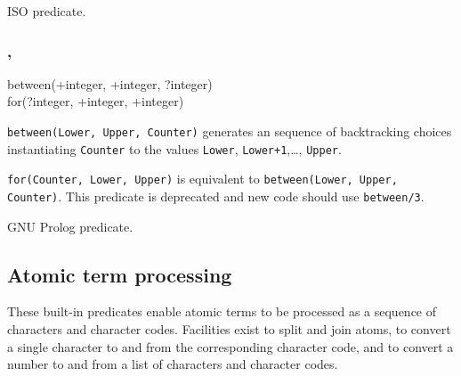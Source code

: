\PlErrorsNone

\Portability

ISO predicate.

\subsubsection{, }

\begin{TemplatesOneCol}
between(+integer, +integer, ?integer) \\
for(?integer, +integer, +integer)

\end{TemplatesOneCol}

\Description

\texttt{between(Lower, Upper, Counter)} generates an sequence of backtracking
choices instantiating \texttt{Counter} to the values \texttt{Lower},
\texttt{Lower+1},\ldots, \texttt{Upper}.  

\texttt{for(Counter, Lower, Upper)} is equivalent to
\texttt{between(Lower, Upper, Counter)}. This predicate is deprecated and new
code should use \texttt{between/3}.

\begin{PlErrors}






\end{PlErrors}

\Portability

GNU Prolog predicate.

\subsection{Atomic term processing}
These built-in predicates enable atomic terms to be processed as a sequence
of characters and character codes. Facilities exist to split and join atoms,
to convert a single character to and from the corresponding character code,
and to convert a number to and from a list of characters and character
codes.

